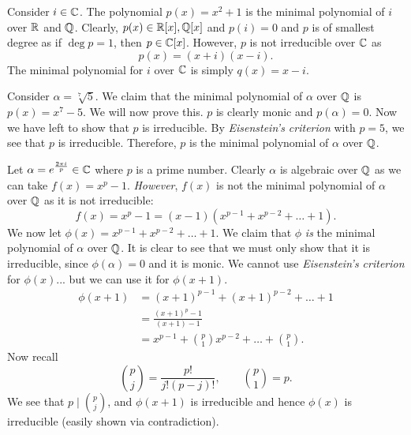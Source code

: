 \begin{example}[]
	Consider $i \in \mathbb{C}$.
	The polynomial $p(x) = x^2 + 1$ is the minimal polynomial of $i$
	over $\mathbb{R}$ and $\mathbb{Q}$.
	Clearly, $p(x) \in \mathbb{R}[x], \mathbb{Q}[x]$ and $p(i) = 0$
	and $p$ is of smallest degree as if $\deg p = 1$, then $p \in \mathbb{C}[x]$.
	However, $p$ is not irreducible over $\mathbb{C}$ as
	\[
		p(x) = (x+i)(x-i).
	\]
	The minimal polynomial for $i$ over $\mathbb{C}$ is simply $q(x) = x - i$.
\end{example}

\begin{example}[]
	Consider $\alpha = \sqrt[7]{5}$.
	We claim that the minimal polynomial of $\alpha$ over $\mathbb{Q}$ is
	$p(x) = x^7 - 5$.
	We will now prove this.
	$p$ is clearly monic and $p(\alpha) = 0$.
	Now we have left to show that $p$ is irreducible.
	By \emph{Eisenstein's criterion} with $p = 5$, we see that
	$p$ is irreducible.
	Therefore, $p$ is the minimal polynomial of $\alpha$ over $\mathbb{Q}$.
\end{example}

\begin{example}[]
	Let $\alpha = e^{\frac{2\pi i}{p}} \in \mathbb{C}$ where $p$ is a prime number.
	Clearly $\alpha$ is algebraic over $\mathbb{Q}$ as we can take $f(x) = x^p - 1$.
	\emph{However}, $f(x)$ is not the minimal polynomial of $\alpha$ over $\mathbb{Q}$
	as it is not irreducible:
	\[
		f(x) = x^p - 1 = (x - 1)(x^{p-1} + x^{p-2} + \ldots + 1).
	\]
	We now let $\phi(x) = x^{p-1} + x^{p-2} + \ldots + 1$.
	We claim that $\phi$ \emph{is} the minimal polynomial of $\alpha$ over $\mathbb{Q}$.
	It is clear to see that we must only show that it is irreducible,
	since $\phi(\alpha) = 0$ and it is monic.
	We cannot use \emph{Eisenstein's criterion} for $\phi(x)$...
	but we can use it for $\phi(x + 1)$.
	\begin{align*}
		\phi(x+1)
		&= (x+1)^{p-1} + (x+1)^{p-2} + \ldots + 1 \\
		&= \frac{(x+1)^p - 1}{(x + 1) - 1} \\
		&= x^{p-1} + \binom p1 x^{p-2} + \ldots + \binom p1.
	\end{align*}
	Now recall
	\[
		\binom pj = \frac{p!}{j!(p-j)!} , \qquad \binom p1 = p.
	\]
	We see that $p \mid \binom pj$, and $\phi(x+1)$ is irreducible
	and hence $\phi(x)$ is irreducible (easily shown via contradiction).
\end{example}
